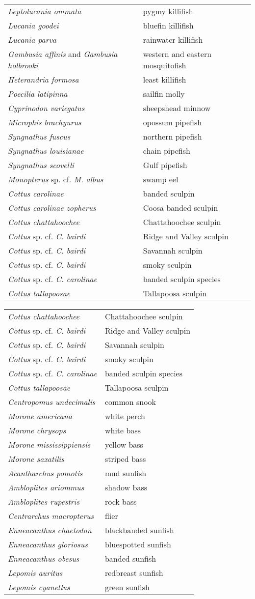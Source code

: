 \documentclass[11pt]{article}
\begin{document}
\begin{tabular}{@{}L{3in}L{3in}@{}}
\textit{Leptolucania ommata} &   pygmy killifish\tabularnewline
\textit{Lucania goodei} &   bluefin killifish\tabularnewline
\textit{Lucania parva} &   rainwater killifish\tabularnewline
\textit{Gambusia affinis} and \textit{Gambusia holbrooki} &   western and eastern mosquitofish\tabularnewline
\textit{Heterandria formosa} &   least killifish\tabularnewline
\textit{Poecilia latipinna} &   sailfin molly\tabularnewline
\textit{Cyprinodon variegatus} &   sheepshead minnow\tabularnewline
\textit{Microphis brachyurus} &   opossum pipefish\tabularnewline
\textit{Syngnathus fuscus} &   northern pipefish\tabularnewline
\textit{Syngnathus louisianae} &   chain pipefish\tabularnewline
\textit{Syngnathus scovelli} &   Gulf pipefish\tabularnewline
\textit{Monopterus} sp. cf. \textit{M. albus} &   swamp eel\tabularnewline
\textit{Cottus carolinae} &   banded sculpin\tabularnewline
\textit{Cottus carolinae zopherus} &   Coosa banded sculpin\tabularnewline
\textit{Cottus chattahoochee} &   Chattahoochee sculpin\tabularnewline
\textit{Cottus} sp. cf. \textit{C. bairdi} &   Ridge and Valley sculpin\tabularnewline
\textit{Cottus} sp. cf. \textit{C. bairdi} &   Savannah sculpin\tabularnewline
\textit{Cottus} sp. cf. \textit{C. bairdi} &   smoky sculpin\tabularnewline
\textit{Cottus} sp. cf. \textit{C. carolinae} &   banded sculpin species\tabularnewline
\textit{Cottus tallapoosae} &   Tallapoosa sculpin\tabularnewline
\end{tabular}


\vspace{\baselineskip}

%
\textbf{\Student}

\begin{tabular}{@{}L{3in}L{3in}@{}}
\textit{Cottus chattahoochee} &   Chattahoochee sculpin\tabularnewline
\textit{Cottus} sp. cf. \textit{C. bairdi} &   Ridge and Valley sculpin\tabularnewline
\textit{Cottus} sp. cf. \textit{C. bairdi} &   Savannah sculpin\tabularnewline
\textit{Cottus} sp. cf. \textit{C. bairdi} &   smoky sculpin\tabularnewline
\textit{Cottus} sp. cf. \textit{C. carolinae} &   banded sculpin species\tabularnewline
\textit{Cottus tallapoosae} &   Tallapoosa sculpin\tabularnewline
\textit{Centropomus undecimalis} &   common snook\tabularnewline
\textit{Morone americana} &   white perch\tabularnewline
\textit{Morone chrysops} &   white bass\tabularnewline
\textit{Morone mississippiensis} &   yellow bass\tabularnewline
\textit{Morone saxatilis} &   striped bass\tabularnewline
\textit{Acantharchus pomotis} &   mud sunfish\tabularnewline
\textit{Ambloplites ariommus} &   shadow bass\tabularnewline
\textit{Ambloplites rupestris} &   rock bass\tabularnewline
\textit{Centrarchus macropterus} &   flier\tabularnewline
\textit{Enneacanthus chaetodon} &   blackbanded sunfish\tabularnewline
\textit{Enneacanthus gloriosus} &   bluespotted sunfish\tabularnewline
\textit{Enneacanthus obesus} &   banded sunfish\tabularnewline
\textit{Lepomis auritus} &   redbreast sunfish\tabularnewline
\textit{Lepomis cyanellus} &   green sunfish\tabularnewline
\end{tabular}
\end{document}
